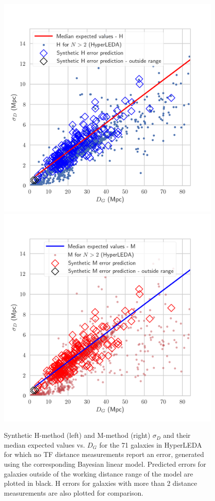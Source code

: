 \documentclass[a4paper,fleqn,usenatbib]{mnras}
\begin{document}
\begin{figure}
	\includegraphics[scale=0.69]{predhl1.png}
	\includegraphics[scale=0.69]{predhl2.png}
    \caption{Synthetic H-method (left) and M-method (right) $\sigma_D$ and their median expected values vs. $D_G$ for the 71 galaxies in HyperLEDA for which no TF distance measurements report an error, generated using the corresponding Bayesian linear model. Predicted errors for galaxies outside of the working distance range of the model are plotted in black. H errors for galaxies with more than 2 distance measurements are also plotted for comparison.}
    \label{fig:predhl1}
\end{figure}
\end{document}
